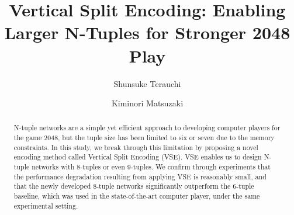 \documentclass[runningheads]{llncs}
\begin{document}
%
\title{Vertical Split Encoding: Enabling Larger N-Tuples for Stronger 2048 Play}
%
%
\author{Shunsuke Terauchi \and %
Kiminori Matsuzaki}
%
%
%
\maketitle              %
%
\begin{abstract}
N-tuple networks are a simple yet efficient approach to developing computer players for the game 2048,
but the tuple size has been limited to six or seven due to the memory constraints.
In this study, we break through this limitation by proposing a novel encoding method called Vertical Split Encoding (VSE).  VSE enables us to design N-tuple networks with 8-tuples or even 9-tuples.
We confirm through experiments that the performance degradation resulting from applying VSE is reasonably small, and that the newly developed 8-tuple networks significantly outperform the 6-tuple baseline, which was used in the state-of-the-art computer player, under the same experimental setting.

\end{abstract}
%
%
%






% 




\end{document}
